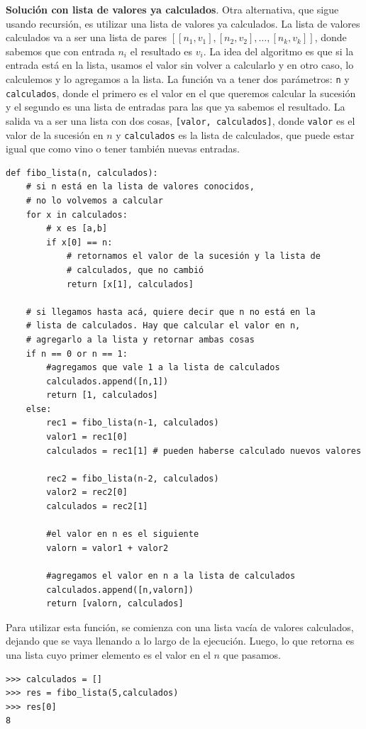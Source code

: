 \documentclass[a4paper, 12pt]{report}
\theoremstyle{definition}
\begin{document}
{\bf Solución con lista de valores ya calculados}. Otra alternativa, que sigue usando recursión, es utilizar una lista de valores ya calculados. La lista de valores calculados va a ser una lista de pares $[[n_1,v_1], [n_2,v_2],\dots, [n_k,v_k]]$, donde sabemos que con entrada $n_i$ el resultado es $v_i$. La idea del algoritmo es que si la entrada está en la lista, usamos el valor sin volver a calcularlo y en otro caso, lo calculemos y lo agregamos a la lista. La función va a tener dos parámetros: {\tt n} y {\tt calculados}, donde el primero es el valor en el que queremos calcular la sucesión y el segundo es una lista de entradas para las que ya sabemos el resultado. La salida va a ser una lista con dos cosas, {\tt [valor, calculados]}, donde {\tt valor} es el valor de la sucesión en $n$ y {\tt calculados} es la lista de calculados, que puede estar igual que como vino o tener también nuevas entradas.
\begin{verbatim}
def fibo_lista(n, calculados):
    # si n está en la lista de valores conocidos,
    # no lo volvemos a calcular
    for x in calculados:
        # x es [a,b]
        if x[0] == n:
            # retornamos el valor de la sucesión y la lista de
            # calculados, que no cambió
            return [x[1], calculados]
    
    # si llegamos hasta acá, quiere decir que n no está en la
    # lista de calculados. Hay que calcular el valor en n,
    # agregarlo a la lista y retornar ambas cosas
    if n == 0 or n == 1:
        #agregamos que vale 1 a la lista de calculados
        calculados.append([n,1])
        return [1, calculados]
    else:
        rec1 = fibo_lista(n-1, calculados)
        valor1 = rec1[0]
        calculados = rec1[1] # pueden haberse calculado nuevos valores
        
        rec2 = fibo_lista(n-2, calculados)
        valor2 = rec2[0]
        calculados = rec2[1]
        
        #el valor en n es el siguiente
        valorn = valor1 + valor2
        
        #agregamos el valor en n a la lista de calculados
        calculados.append([n,valorn])
        return [valorn, calculados]
\end{verbatim}
Para utilizar esta función, se comienza con una lista vacía de valores calculados, dejando que se vaya llenando a lo largo de la ejecución. Luego, lo que retorna es una lista cuyo primer elemento es el valor en el $n$ que pasamos.
\begin{verbatim}
>>> calculados = []
>>> res = fibo_lista(5,calculados)
>>> res[0]
8
\end{verbatim}
\end{document}
